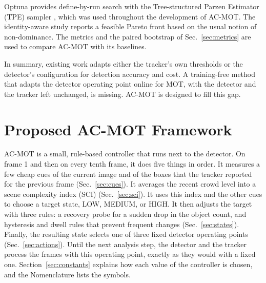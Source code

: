 \documentclass[journal]{new-aiaa}
\begin{document}
Optuna provides define-by-run search with the Tree-structured Parzen Estimator
(TPE) sampler \cite{akiba2019optuna}, which was used throughout the
development of AC-MOT. The identity-aware study reports a feasible Pareto
front based on the usual notion of non-dominance. The metrics and the paired
bootstrap of Sec.~\ref{sec:metrics} are used to compare AC-MOT with its
baselines.

In summary, existing work adapts either the tracker's own thresholds or the
detector's configuration for detection accuracy and cost. A training-free
method that adapts the detector operating point online for MOT, with the
detector and the tracker left unchanged, is missing. AC-MOT is designed to
fill this gap.
\section{Proposed AC-MOT Framework}\label{sec:method}
AC-MOT is a small, rule-based controller that runs next to the detector. On
frame 1 and then on every tenth frame, it does five things in order. It
measures a few cheap cues of the current image and of the boxes that the
tracker reported for the previous frame (Sec.~\ref{sec:cues}). It averages
the recent crowd level into a scene complexity index (SCI) (Sec.~\ref{sec:sci}). It
uses this index and the other cues to choose a target state, LOW, MEDIUM, or
HIGH. It then adjusts the target with three rules: a recovery probe for a
sudden drop in the object count, and hysteresis and dwell rules that prevent
frequent changes (Sec.~\ref{sec:states}). Finally, the resulting state
selects one of three fixed detector operating points
(Sec.~\ref{sec:actions}). Until the next analysis step, the detector and the
tracker process the frames with this operating point, exactly as they would
with a fixed one.
Section~\ref{sec:constants} explains how each value of the controller is
chosen, and the Nomenclature lists the symbols.
\end{document}
